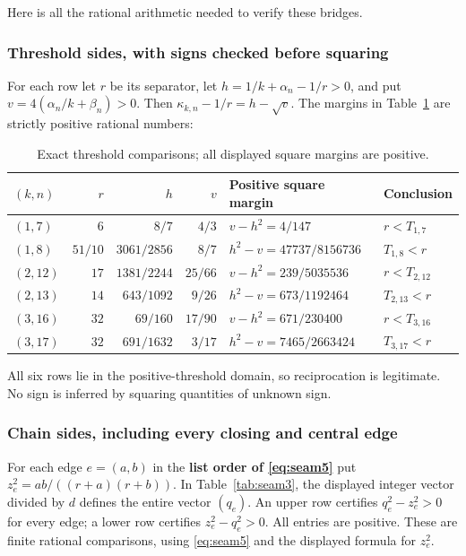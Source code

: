 Here is all the rational arithmetic needed to verify these bridges.

\subsubsection{Threshold sides, with signs checked before squaring}

For each row let $r$ be its separator, let
$h=1/k+\alpha_n-1/r>0$, and put
$v=4(\alpha_n/k+\beta_n)>0$. Then
$\kappa_{k,n}-1/r=h-\sqrt v$. The margins in Table~\ref{tab:seam2} are strictly
positive rational numbers:

\begin{table}[htbp]\centering\small
\caption{Exact threshold comparisons; all displayed square margins are positive.}
\label{tab:seam2}
\setlength{\tabcolsep}{5pt}
\begin{tabular}{lrrrll}
\toprule
$(k,n)$ & $r$ & $h$ & $v$ & Positive square margin & Conclusion \\
\midrule
$(1,7)$ & $6$ & $8/7$ & $4/3$ & $v-h^2=4/147$ & $r<T_{1,7}$ \\
$(1,8)$ & $51/10$ & $3061/2856$ & $8/7$ & $h^2-v=47737/8156736$ & $T_{1,8}<r$ \\
$(2,12)$ & $17$ & $1381/2244$ & $25/66$ & $v-h^2=239/5035536$ & $r<T_{2,12}$ \\
$(2,13)$ & $14$ & $643/1092$ & $9/26$ & $h^2-v=673/1192464$ & $T_{2,13}<r$ \\
$(3,16)$ & $32$ & $69/160$ & $17/90$ & $v-h^2=671/230400$ & $r<T_{3,16}$ \\
$(3,17)$ & $32$ & $691/1632$ & $3/17$ & $h^2-v=7465/2663424$ & $T_{3,17}<r$ \\
\bottomrule
\end{tabular}
\end{table}

All six rows lie in the positive-threshold domain, so reciprocation is
legitimate. No sign is inferred by squaring quantities of unknown sign.

\subsubsection{Chain sides, including every closing and central edge}

For each edge $e=(a,b)$ in the \textbf{list order of \eqref{eq:seam5}} put
$z_e^2=ab/((r+a)(r+b))$. In Table~\ref{tab:seam3}, the displayed integer
vector divided by $d$ defines the entire vector $(q_e)$.
An upper row certifies $q_e^2-z_e^2>0$ for every edge; a lower row
certifies $z_e^2-q_e^2>0$. All entries are positive. These are finite
rational comparisons, using \eqref{eq:seam5} and the displayed formula for $z_e^2$.


